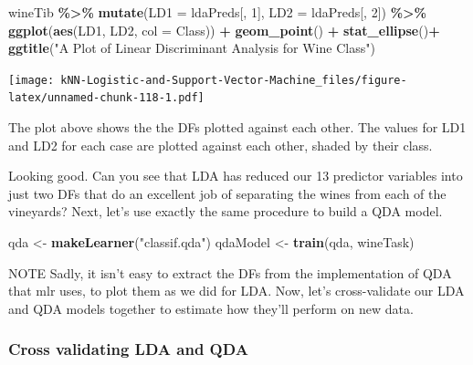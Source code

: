 \documentclass[
]{article}
\newenvironment{Shaded}{\begin{snugshade}}{\end{snugshade}}
\newcommand{\AttributeTok}[1]{\textcolor[rgb]{0.13,0.29,0.53}{#1}}
\newcommand{\DecValTok}[1]{\textcolor[rgb]{0.00,0.00,0.81}{#1}}
\newcommand{\FunctionTok}[1]{\textcolor[rgb]{0.13,0.29,0.53}{\textbf{#1}}}
\newcommand{\NormalTok}[1]{#1}
\newcommand{\OtherTok}[1]{\textcolor[rgb]{0.56,0.35,0.01}{#1}}
\newcommand{\SpecialCharTok}[1]{\textcolor[rgb]{0.81,0.36,0.00}{\textbf{#1}}}
\newcommand{\StringTok}[1]{\textcolor[rgb]{0.31,0.60,0.02}{#1}}
\begin{document}
\begin{Shaded}
\begin{Highlighting}[]
\NormalTok{wineTib }\SpecialCharTok{\%\textgreater{}\%}
  \FunctionTok{mutate}\NormalTok{(}\AttributeTok{LD1 =}\NormalTok{ ldaPreds[, }\DecValTok{1}\NormalTok{],}
         \AttributeTok{LD2 =}\NormalTok{ ldaPreds[, }\DecValTok{2}\NormalTok{]) }\SpecialCharTok{\%\textgreater{}\%}
  \FunctionTok{ggplot}\NormalTok{(}\FunctionTok{aes}\NormalTok{(LD1, LD2, }\AttributeTok{col =}\NormalTok{ Class)) }\SpecialCharTok{+}
  \FunctionTok{geom\_point}\NormalTok{() }\SpecialCharTok{+}
  \FunctionTok{stat\_ellipse}\NormalTok{()}\SpecialCharTok{+}
  \FunctionTok{ggtitle}\NormalTok{(}\StringTok{"A Plot of Linear Discriminant Analysis for Wine Class"}\NormalTok{)}
\end{Highlighting}
\end{Shaded}

\texttt{[image: kNN-Logistic-and-Support-Vector-Machine\_files/figure-latex/unnamed-chunk-118-1.pdf]}

The plot above shows the the DFs plotted against each other. The values
for LD1 and LD2 for each case are plotted against each other, shaded by
their class.

Looking good. Can you see that LDA has reduced our 13 predictor
variables into just two DFs that do an excellent job of separating the
wines from each of the vineyards? Next, let's use exactly the same
procedure to build a QDA model.

\begin{Shaded}
\begin{Highlighting}[]
\NormalTok{qda }\OtherTok{\textless{}{-}} \FunctionTok{makeLearner}\NormalTok{(}\StringTok{"classif.qda"}\NormalTok{)}
\NormalTok{qdaModel }\OtherTok{\textless{}{-}} \FunctionTok{train}\NormalTok{(qda, wineTask)}
\end{Highlighting}
\end{Shaded}

NOTE Sadly, it isn't easy to extract the DFs from the implementation of
QDA that mlr uses, to plot them as we did for LDA. Now, let's
cross-validate our LDA and QDA models together to estimate how they'll
perform on new data.

\subsubsection{Cross validating LDA and
QDA}\label{cross-validating-lda-and-qda}
\end{document}
